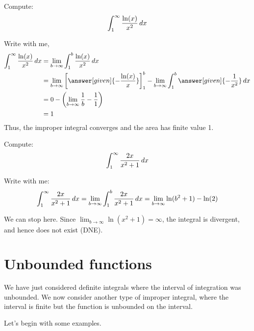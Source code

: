 \documentclass{ximera}
\begin{document}
\begin{example}
  Compute:
  \[
  \int_{1}^{\infty}\frac{\ln(x)}{x^2} \mathop{}\!d x
  \]
  \begin{explanation}
    Write with me,
    \begin{align*}
      \int_{1}^{\infty}\frac{\ln(x)}{x^2} \d x & = \lim_{b\to \infty} \int_{1}^{b}\frac{\ln(x)}{x^2} \d x\\
      & = \lim_{b\to \infty}\left[ \answer[given]{-\frac{\ln(x)}{x}} \right]_{1}^{b} - \lim_{b\to \infty}\int_{1}^{b}\answer[given]{-\frac{1}{x^2}} \d x\\
      & = 0 - \left(\lim_{b\to \infty}\frac{1}{b} - \frac{1}{1}\right)\\
      & = 1
    \end{align*}
    Thus, the improper integral converges and the area has finite value 1.
  \end{explanation}
  \end{example}

\begin{example}
  Compute:
  \[
  \int_{1}^{\infty} \frac{2x}{x^2+1} \mathop{}\!d x
  \]
  \begin{explanation}
    Write with me:
    \[
    \int_{1}^{\infty} \frac{2x}{x^2+1} \mathop{}\!d x = \lim_{b\to \infty} \int_{1}^{b} \frac{2x}{x^2+1} \mathop{}\!d x = \lim_{b\to \infty}\ln(b^2+1) - \ln(2)
    \]

    We can stop here. Since $\lim_{b\to \infty}\ln(x^2+1) = \infty$, the integral is
    divergent, and hence does not exist (DNE).
  \end{explanation}
\end{example}

\section{Unbounded functions}

We have just considered definite integrals where the interval of
integration was unbounded. We now consider another type of improper
integral, where the interval is finite but the function is unbounded on the interval.

Let's begin with some examples.
\end{document}
